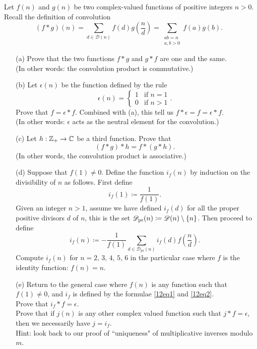 \begin{problem}\label{Problem 12.1}
Let $f(n)$ and $g(n)$ be two complex-valued functions of positive integers $n > 0$. Recall the definition of convolution
\[(f * g)(n) = \sum_{d\in \mathscr{D}(n)}f(d)g\left(\frac{n}{d}\right) = \sum_{\substack{ab = n\\ a,b>0}}f(a)g(b).\]
\begin{itemize}
\item[(a)] Prove that the two functions $f * g$ and $g * f$ are one and the same.\\
{\footnotesize (In other words: the convolution product is commutative.)}
\item[(b)] Let $\epsilon(n)$ be the function defined by the rule
\[\epsilon(n) = \begin{cases} 1 & \text{if $n = 1$}\\[0.5em] 0 & \text{if $n > 1$} \end{cases}.\]
Prove that $f = \epsilon * f$. Combined with (a), this tell us $f*\epsilon = f = \epsilon * f$.\\
{\footnotesize (In other words: $\epsilon$ acts as the neutral element for the convolution.)}
\item[(c)] Let $h:\mathbb Z_+ \to \mathbb C$ be a third function. Prove that
\[(f * g) * h = f * (g * h).\]
{\footnotesize (In other words, the convolution product is associative.)}
\item[(d)] Suppose that $f(1) \neq 0$. Define the function $i_f(n)$ by induction on the divisibility of $n$ as follows. First define
\begin{equation}\label{12eq1}
i_f (1) \coloneqq \frac{1}{f(1)}. \tag{12.1.d.1}
\end{equation}
Given an integer $n > 1$, assume we have defined $i_f(d)$ for all the proper positive divisors $d$ of $n$, this is the set $\mathscr{D}_{\text{pr}}(n) \coloneqq \mathscr{D}(n)\setminus\left\{n\right\}$. Then proceed to define
\begin{equation}\label{12eq2}
i_f (n) \coloneqq -\frac{1}{f(1)} \sum_{d\in \mathscr{D}_{\text{pr}}(n)}i_f(d)f\left(\frac{n}{d}\right). \tag{12.1.d.2}
\end{equation}
Compute $i_f(n)$ for $n = 2,\, 3,\, 4,\, 5,\, 6$ in the particular case where $f$ is the identity function: $f(n) = n$.
\item[(e)] Return to the general case where $f(n)$ is any function such that $f(1) \neq 0$, and $i_f$ is defined by the formulae \eqref{12eq1} and \eqref{12eq2}.\\[0.5em]
Prove that $i_f * f = \epsilon$.\\[0.5em]
Prove that if $j(n)$ is any other complex valued function such that $j * f = \epsilon$, then we necessarily have $j = i_f$.\\[0.2em]
{\footnotesize Hint: look back to our proof of ``uniqueness" of multiplicative inverses modulo $m$.}
\end{itemize}
\end{problem}

